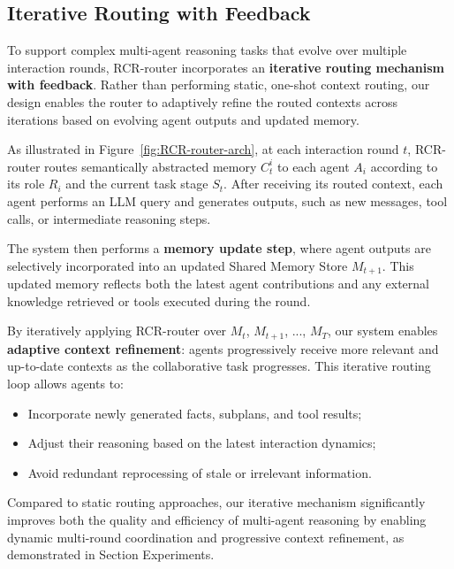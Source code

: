 \documentclass[letterpaper]{article} %
\begin{document}
\subsection{Iterative Routing with Feedback}

To support complex multi-agent reasoning tasks that evolve over multiple interaction rounds, RCR-router incorporates an \textbf{iterative routing mechanism with feedback}. Rather than performing static, one-shot context routing, our design enables the router to adaptively refine the routed contexts across iterations based on evolving agent outputs and updated memory.


As illustrated in Figure~\ref{fig:RCR-router-arch}, at each interaction round $t$, RCR-router routes semantically abstracted memory $C_t^i$ to each agent $A_i$ according to its role $R_i$ and the current task stage $S_t$. After receiving its routed context, each agent performs an LLM query and generates outputs, such as new messages, tool calls, or intermediate reasoning steps.

The system then performs a \textbf{memory update step}, where agent outputs are selectively incorporated into an updated Shared Memory Store $M_{t+1}$. This updated memory reflects both the latest agent contributions and any external knowledge retrieved or tools executed during the round.

By iteratively applying RCR-router over $M_t$, $M_{t+1}$, ..., $M_T$, our system enables \textbf{adaptive context refinement}: agents progressively receive more relevant and up-to-date contexts as the collaborative task progresses. This iterative routing loop allows agents to:
\begin{itemize}
    \item Incorporate newly generated facts, subplans, and tool results;
    \item Adjust their reasoning based on the latest interaction dynamics;
    \item Avoid redundant reprocessing of stale or irrelevant information.
\end{itemize}

Compared to static routing approaches, our iterative mechanism significantly improves both the quality and efficiency of multi-agent reasoning by enabling dynamic multi-round coordination and progressive context refinement, as demonstrated in Section Experiments.
\end{document}
